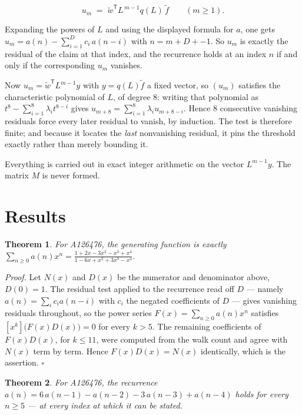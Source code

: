\documentclass[11pt]{article}
\newtheorem{theorem}{Theorem}
\theoremstyle{definition}
\begin{document}
\[u_m \;=\; \tilde w^{\mathsf T} L^{\,m-1} q(L)\,\tilde f \qquad (m \ge 1).\]

Expanding the powers of $L$ and using the displayed formula for $a$, one gets $u_m = a(n) - \sum_{i=1}^{D} c_i\,a(n-i)$ with $n = m + D + -1$. So $u_m$ is exactly the residual of the claim at that index, and the recurrence holds at an index $n$ if and only if the corresponding $u_m$ vanishes.

Now $u_m = \tilde w^{\mathsf T} L^{m-1} y$ with $y = q(L)\tilde f$ a fixed vector, so $(u_m)$ satisfies the characteristic polynomial of $L$, of degree $8$: writing that polynomial as $t^{8} - \sum_{i=1}^{8} \lambda_i t^{8-i}$ gives $u_{m+8} = \sum_{i=1}^{8} \lambda_i u_{m+8-i}$. Hence $8$ consecutive vanishing residuals force every later residual to vanish, by induction. The test is therefore finite; and because it locates the {\itshape last} nonvanishing residual, it pins the threshold exactly rather than merely bounding it.

Everything is carried out in exact integer arithmetic on the vector $L^{m-1}y$. The matrix $M$ is never formed.

\section{Results}

\begin{theorem} For A126476, the generating function is exactly $\sum_{n\ge 0} a(n)x^n = \frac{1 + 2x - 3x^{2} - x^{3} + x^{4}}{1 - 6x + x^{2} + 3x^{3} - x^{4}}$.\end{theorem}

{\itshape Proof.} Let $N(x)$ and $D(x)$ be the numerator and denominator above, $D(0)=1$. The residual test applied to the recurrence read off $D$ --- namely $a(n) = \sum_i c_i a(n-i)$ with $c_i$ the negated coefficients of $D$ --- gives vanishing residuals throughout, so the power series $F(x)=\sum_{n\ge 0}a(n)x^n$ satisfies $[x^k]\bigl(F(x)D(x)\bigr) = 0$ for every $k > 5$. The remaining coefficients of $F(x)D(x)$, for $k \le 11$, were computed from the walk count and agree with $N(x)$ term by term. Hence $F(x)D(x) = N(x)$ identically, which is the assertion. $\square$

\begin{theorem} For A126476, the recurrence $a(n) = 6\,a(n-1) - a(n-2) - 3\,a(n-3) + a(n-4)$ holds for every $n \ge 5$ --- at every index at which it can be stated.\end{theorem}
\end{document}
